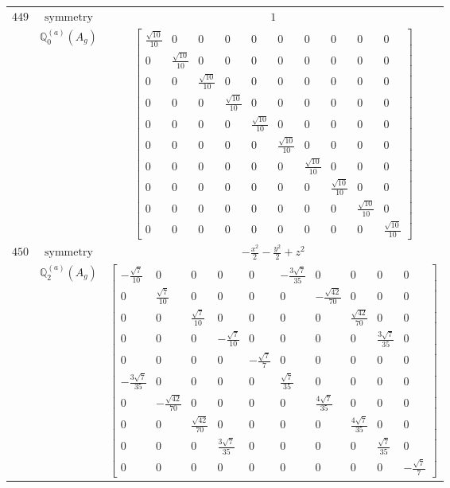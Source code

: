 \documentclass[fleqn,8pt,landscape]{jsarticle}
\begin{document}
\begin{longtable}{ccc}
$ 449 $ & $ \text{symmetry} $ & $ 1 $ \\
$  $ & $ \mathbb{Q}_{0}^{(a)}(A_{g}) $ & $ \begin{bmatrix} \frac{\sqrt{10}}{10} & 0 & 0 & 0 & 0 & 0 & 0 & 0 & 0 & 0 \\ 0 & \frac{\sqrt{10}}{10} & 0 & 0 & 0 & 0 & 0 & 0 & 0 & 0 \\ 0 & 0 & \frac{\sqrt{10}}{10} & 0 & 0 & 0 & 0 & 0 & 0 & 0 \\ 0 & 0 & 0 & \frac{\sqrt{10}}{10} & 0 & 0 & 0 & 0 & 0 & 0 \\ 0 & 0 & 0 & 0 & \frac{\sqrt{10}}{10} & 0 & 0 & 0 & 0 & 0 \\ 0 & 0 & 0 & 0 & 0 & \frac{\sqrt{10}}{10} & 0 & 0 & 0 & 0 \\ 0 & 0 & 0 & 0 & 0 & 0 & \frac{\sqrt{10}}{10} & 0 & 0 & 0 \\ 0 & 0 & 0 & 0 & 0 & 0 & 0 & \frac{\sqrt{10}}{10} & 0 & 0 \\ 0 & 0 & 0 & 0 & 0 & 0 & 0 & 0 & \frac{\sqrt{10}}{10} & 0 \\ 0 & 0 & 0 & 0 & 0 & 0 & 0 & 0 & 0 & \frac{\sqrt{10}}{10} \end{bmatrix} $ \\ \hline
$ 450 $ & $ \text{symmetry} $ & $ - \frac{x^{2}}{2} - \frac{y^{2}}{2} + z^{2} $ \\
$  $ & $ \mathbb{Q}_{2}^{(a)}(A_{g}) $ & $ \begin{bmatrix} - \frac{\sqrt{7}}{10} & 0 & 0 & 0 & 0 & - \frac{3 \sqrt{7}}{35} & 0 & 0 & 0 & 0 \\ 0 & \frac{\sqrt{7}}{10} & 0 & 0 & 0 & 0 & - \frac{\sqrt{42}}{70} & 0 & 0 & 0 \\ 0 & 0 & \frac{\sqrt{7}}{10} & 0 & 0 & 0 & 0 & \frac{\sqrt{42}}{70} & 0 & 0 \\ 0 & 0 & 0 & - \frac{\sqrt{7}}{10} & 0 & 0 & 0 & 0 & \frac{3 \sqrt{7}}{35} & 0 \\ 0 & 0 & 0 & 0 & - \frac{\sqrt{7}}{7} & 0 & 0 & 0 & 0 & 0 \\ - \frac{3 \sqrt{7}}{35} & 0 & 0 & 0 & 0 & \frac{\sqrt{7}}{35} & 0 & 0 & 0 & 0 \\ 0 & - \frac{\sqrt{42}}{70} & 0 & 0 & 0 & 0 & \frac{4 \sqrt{7}}{35} & 0 & 0 & 0 \\ 0 & 0 & \frac{\sqrt{42}}{70} & 0 & 0 & 0 & 0 & \frac{4 \sqrt{7}}{35} & 0 & 0 \\ 0 & 0 & 0 & \frac{3 \sqrt{7}}{35} & 0 & 0 & 0 & 0 & \frac{\sqrt{7}}{35} & 0 \\ 0 & 0 & 0 & 0 & 0 & 0 & 0 & 0 & 0 & - \frac{\sqrt{7}}{7} \end{bmatrix} $ \\ \hline

\end{longtable}
\end{document}
